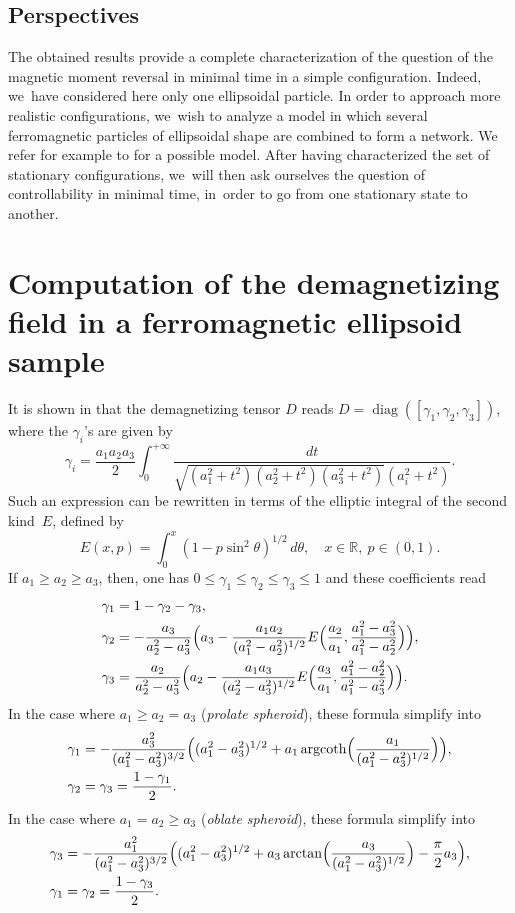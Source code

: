 \documentclass[JEP,XML,SOM,Unicode,NoEqCountersInSection,NoFloatCountersInSection,published]{cedram}
\theoremstyle{definition}
\newcommand{\R} {\mathbb{R}}
\begin{document}
\subsection{{Perspectives}}
The obtained results provide a complete characterization of the question of the magnetic moment reversal in minimal time in a simple configuration. Indeed, we~have considered here only one ellipsoidal particle. In order to approach more realistic configurations, we~wish to analyze a model in which several ferromagnetic particles of ellipsoidal shape are combined to form a network. We refer for example to \cite{MR2833256} for a possible model. After having characterized the set of stationary configurations, we~will then ask ourselves the question of controllability in minimal time, in~order to go from one stationary state to another.

\appendix
\section{Computation of the demagnetizing field in a ferromagnetic ellipsoid sample}\label{append:demag_ellips}

It is shown in \cite{osborn1945demagnetizing,di2016newtonian} that the demagnetizing tensor $D$ reads $D=\operatorname{diag}([\gamma_1,\gamma_2,\gamma_3])$, where the $\gamma_i$'s are given by
\[
\gamma_i=\frac{a_1a_2a_3}{2} \int_0^{+\infty}\frac{dt}{\sqrt{(a_1^2+t^2)(a_2^2+t^2)(a_3^2+t^2)}(a_i^2+t^2)}.
\]
Such an expression can be rewritten in terms of the elliptic integral of the second kind~$E$, defined by
\[
E(x,p)=\int_0^x (1-p\sin^2\theta)^{1/2}\, d\theta, \quad x\in \R, \ p\in (0,1).
\]
If $a_1\geq a_2\geq a_3$, then, one has $0\leq \gamma_1\leq \gamma_2\leq \gamma_3\leq 1$ and these coefficients read
\begin{align*}
\gamma_1 &= 1-\gamma_2-\gamma_3,\\
\gamma_2 &= -\frac{a_3}{a_2^2-a_3^2}\Bigl(a_3-\frac{a_1a_2}{(a_1^2-a_2^2)^{1/2}}E\Bigl(\frac{a_2}{a_1},\frac{a_1^2-a_3^2}{a_1^2-a_2^2}\Bigr)\Bigr),\\
\gamma_3 &= \frac{a_2}{a_2^2-a_3^2}\Bigl(a_2-\frac{a_1a_3}{(a_2^2-a_3^2)^{1/2}}E\Bigl(\frac{a_3}{a_1},\frac{a_1^2-a_2^2}{a_1^2-a_3^2}\Bigr)\Bigr).
\end{align*}
In the case where $a_1\geq a_2=a_3$ (\emph{prolate spheroid}), these formula simplify into
\begin{align*}
\gamma_1&= -\frac{a_3^2}{(a_1^2-a_3^2)^{3/2}}\Bigl((a_1^2-a_3^2)^{1/2}+a_1\operatorname{argcoth}\Bigl(\frac{a_1}{(a_1^2-a_3^2)^{1/2}}\Bigr) \Bigr), \\
\gamma_2&=\gamma_3=\frac{1-\gamma_1}{2}.
\end{align*}
In the case where $a_1= a_2\geq a_3$ (\emph{oblate spheroid}), these formula simplify into
\begin{align*}
\gamma_3&= -\frac{a_1^2}{(a_1^2-a_3^2)^{3/2}}\Bigl((a_1^2-a_3^2)^{1/2}+a_3\arctan\Bigl(\frac{a_3}{(a_1^2-a_3^2)^{1/2}}\Bigr) -\frac{\pi}{2}a_3\Bigr), \\
\gamma_1&=\gamma_2=\frac{1-\gamma_3}{2}.
\end{align*}
\end{document}
